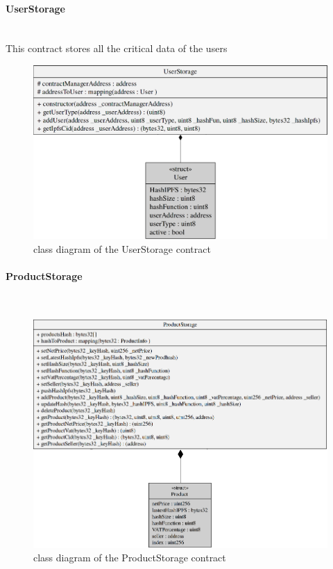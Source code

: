 \paragraph{UserStorage}\mbox{}\\
This contract stores all the critical data of the users 
\begin{figure}[H]
	\centering
	\includegraphics[scale=0.25]{res/images/solidity/userstorage.png}
	\caption{class diagram of the UserStorage contract}
\end{figure}
\pagebreak
\paragraph{ProductStorage}\mbox{}\\
\begin{figure}[H]
	\centering
	\includegraphics[scale=0.45]{res/images/solidity/productstorage.png}
	\caption{class diagram of the ProductStorage contract}
\end{figure}
\pagebreak
